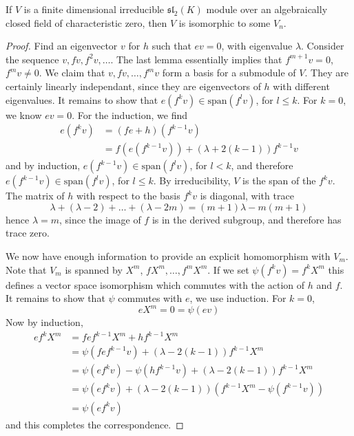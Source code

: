 \begin{theorem}
    If $V$ is a finite dimensional irreducible $\mathfrak{sl}_2(K)$ module over an algebraically closed field of characteristic zero, then $V$ is isomorphic to some $V_n$.
\end{theorem}
\begin{proof}
    Find an eigenvector $v$ for $h$ such that $ev = 0$, with eigenvalue $\lambda$. Consider the sequence $v, fv, f^2 v, \dots$. The last lemma essentially implies that $f^{m+1} v = 0$, $f^m v \neq 0$. We claim that $v, fv, \dots, f^m v$ form a basis for a submodule of $V$. They are certainly linearly independant, since they are eigenvectors of $h$ with different eigenvalues. It remains to show that $e(f^k v) \in \text{span}(f^l v)$, for $l \leq k$. For $k = 0$, we know $ev = 0$. For the induction, we find
    \begin{align*}
        e(f^k v) &= (f e + h) (f^{k-1} v)\\
        &= f(e(f^{k-1} v)) + (\lambda + 2(k-1)) f^{k-1} v
    \end{align*}
    and by induction, $e(f^{k-1} v) \in \text{span}(f^l v)$, for $l < k$, and therefore $e(f^{k-1} v) \in \text{span}(f^l v)$, for $l \leq k$. By irreducibility, $V$ is the span of the $f^k v$. The matrix of $h$ with respect to the basis $f^k v$ is diagonal, with trace
    \[ \lambda + (\lambda - 2) + \dots + (\lambda - 2m) = (m+1) \lambda - m(m+1) \]
    hence $\lambda = m$, since the image of $f$ is in the derived subgroup, and therefore has trace zero.

    We now have enough information to provide an explicit homomorphism with $V_m$. Note that $V_m$ is spanned by $X^m$, $fX^m, \dots, f^m X^m$. If we set $\psi(f^k v) = f^k X^m$ this defines a vector space isomorphism which commutes with the action of $h$ and $f$. It remains to show that $\psi$ commutes with $e$, we use induction. For $k = 0$,
    \[ eX^m = 0 = \psi(ev) \]
    Now by induction,
    \begin{align*}
        ef^k X^m &= f e f^{k-1} X^m + h f^{k-1} X^m\\
        &= \psi(f e f^{k-1} v) + (\lambda - 2(k-1)) f^{k-1} X^m \\
        &= \psi(ef^k v) - \psi(hf^{k-1} v) + (\lambda - 2(k-1)) f^{k-1} X^m\\
        &= \psi(ef^k v) + (\lambda - 2(k-1))(f^{k-1} X^m - \psi(f^{k-1} v))\\
        &= \psi(ef^k v)
    \end{align*}
    and this completes the correspondence.
\end{proof}

